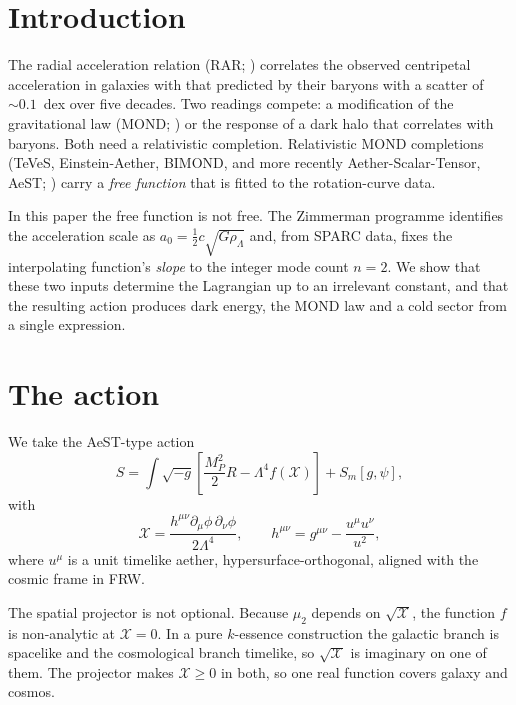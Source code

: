 \documentclass[useAMS,usenatbib]{mnras}
\begin{document}
\section{Introduction}

The radial acceleration relation (RAR; \citealt{McGaugh2016}) correlates the
observed centripetal acceleration in galaxies with that predicted by their
baryons with a scatter of $\sim0.1$~dex over five decades.  Two readings
compete: a modification of the gravitational law (MOND;
\citealt{Milgrom1983}) or the response of a dark halo that correlates with
baryons.  Both need a relativistic completion.  Relativistic MOND
completions (TeVeS, Einstein-Aether, BIMOND, and more recently
Aether-Scalar-Tensor, AeST; \citealt{SkordisZlosnik2021}) carry a
\emph{free function} that is fitted to the rotation-curve data.

In this paper the free function is not free.  The Zimmerman programme
\citep{ZimmermanProgramme} identifies the acceleration scale as
$a_0=\tfrac12 c\sqrt{G\rho_\Lambda}$ and, from SPARC data, fixes the
interpolating function's \emph{slope} to the integer mode count $n=2$.  We
show that these two inputs determine the Lagrangian up to an irrelevant
constant, and that the resulting action produces dark energy, the MOND law
and a cold sector from a single expression.

\section{The action}

We take the AeST-type action
\begin{equation}
S=\int\!\sqrt{-g}\left[\frac{M_P^2}{2}R-\Lambda^4 f(\mathcal{X})\right]+S_m[g,\psi],
\end{equation}
with
\begin{equation}
\mathcal{X}=\frac{h^{\mu\nu}\partial_\mu\phi\,\partial_\nu\phi}{2\Lambda^4},
\qquad
h^{\mu\nu}=g^{\mu\nu}-\frac{u^\mu u^\nu}{u^2},
\end{equation}
where $u^\mu$ is a unit timelike aether, hypersurface-orthogonal, aligned
with the cosmic frame in FRW.

The spatial projector is not optional.  Because $\mu_2$ depends on
$\sqrt{\mathcal{X}}$, the function $f$ is non-analytic at
$\mathcal{X}=0$.  In a pure $k$-essence construction the galactic branch is
spacelike and the cosmological branch timelike, so $\sqrt{\mathcal{X}}$ is
imaginary on one of them.  The projector makes $\mathcal{X}\ge0$ in both, so
one real function covers galaxy and cosmos.
\end{document}
